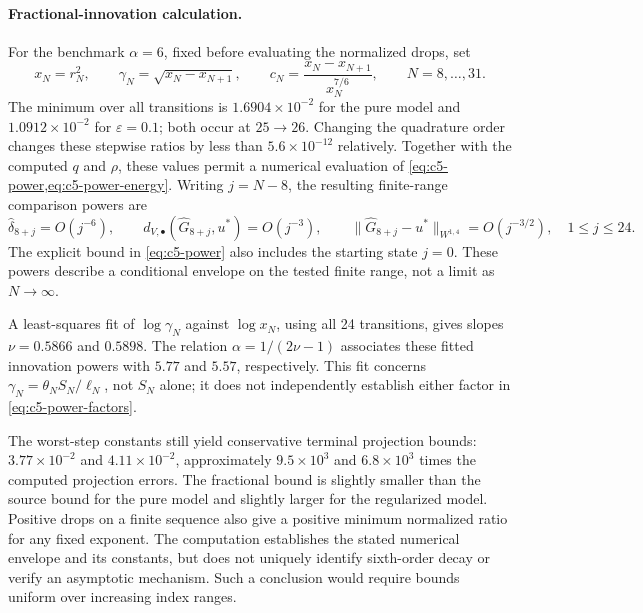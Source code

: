 \paragraph{Fractional-innovation calculation.}
For the benchmark \(\alpha=6\), fixed before evaluating the normalized drops, set
\begin{equation}
 x_N=r_N^2,\qquad
 \gamma_N=\sqrt{x_N-x_{N+1}},\qquad
 c_N=\frac{x_N-x_{N+1}}{x_N^{7/6}},\qquad N=8,\ldots,31.
 \label{eq:numerical-fractional-ratio}
\end{equation}
The minimum over all transitions is \(1.6904\times10^{-2}\) for the pure model and
\(1.0912\times10^{-2}\) for \(\varepsilon=0.1\); both occur at \(25\to26\).
Changing the quadrature order changes these stepwise ratios by less than
\(5.6\times10^{-12}\) relatively. Together with the computed \(q\) and \(\rho\), these
values permit a numerical evaluation of \cref{eq:c5-power,eq:c5-power-energy}.
Writing \(j=N-8\), the resulting finite-range comparison powers are
\[
 \widehat\delta_{8+j}=O(j^{-6}),\qquad
 d_{V,\bullet}(\widehat G_{8+j},u^*)=O(j^{-3}),\qquad
 \|\widehat G_{8+j}-u^*\|_{W^{1,4}}=O(j^{-3/2}),\quad 1\leq j\leq24.
\]
The explicit bound in \cref{eq:c5-power} also includes the starting state \(j=0\).
These powers describe a conditional envelope on the tested finite range, not a limit as \(N\to\infty\).



A least-squares fit of \(\log\gamma_N\) against \(\log x_N\), using all 24 transitions,
gives slopes \(\nu=0.5866\) and \(0.5898\). The relation
\(\alpha=1/(2\nu-1)\) associates these fitted innovation powers with \(5.77\) and
\(5.57\), respectively. This fit concerns \(\gamma_N=\theta_NS_N/\ell_N\), not \(S_N\)
alone; it does not independently establish either factor in \cref{eq:c5-power-factors}.

The worst-step constants still yield conservative terminal projection bounds:
\(3.77\times10^{-2}\) and \(4.11\times10^{-2}\), approximately
\(9.5\times10^3\) and \(6.8\times10^3\) times the computed projection errors.
The fractional bound is slightly smaller than the source bound for the pure model and slightly
larger for the regularized model. Positive drops on a finite sequence also give a positive
minimum normalized ratio for any fixed exponent. The computation establishes the stated numerical
envelope and its constants, but does not uniquely identify sixth-order decay or verify an
asymptotic mechanism. Such a conclusion would require bounds uniform over increasing index ranges.

